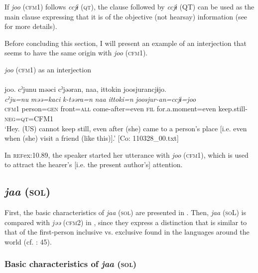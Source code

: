   If \textit{joo} (\textsc{cfm}1) follows \textit{ccjɨ} (\textsc{qt}), the clause followed by \textit{ccjɨ} (QT) can be used as the main clause expressing that it is of the objective (not hearsay) information (see  for more details).

  Before concluding this section, I will present an example of an interjection that seems to have the same origin with \textit{joo} (\textsc{cfm}1).

\ea\label{ex:10.89}   \textit{joo} (\textsc{cfm}1) as an interjection\\\\
      \glll    joo.  cˀjunu  məəci  cˀjəəran,  naa,  {\textbar}ittoki{\textbar}n  joosjurancjɨjo.\\
    \textit{}  \textit{cˀju=nu}  \textit{məə=kaci}  \textit{k-təəra=n}  \textit{naa}  \textit{ittoki=n}   \textit{joosjur-an=ccjɨ=joo}\\
    \textsc{cfm}1  person=\textsc{gen}  front=\textsc{all}  come-after=even  \textsc{fil}  for.a.moment=even  keep.still-\textsc{neg}=\textsc{qt}=CFM1\\
\glt     ‘Hey. (US) cannot keep still, even after (she) came to a person’s place [i.e. even when (she) visit a friend (like this)].’  [Co: 110328\_00.txt]
\z

In \textsc{ref}{ex:10.89}, the speaker started her utterance with \textit{joo} (\textsc{cfm}1), which is used to attract the hearer’s [i.e. the present author’s] attention.

\subsection{\textit{jaa} (\textsc{sol})}\label{sec:10.5.2}

First, the basic characteristics of \textit{jaa} (\textsc{sol}) are presented in . Then, \textit{jaa} (\textsc{so}L) is compared with \textit{jəə} (\textsc{cfm}2) in , since they express a distinction that is similar to that of the first-person inclusive vs. exclusive found in the languages around the world (cf. \citealt{Payne1997}: 45).

\subsubsection{Basic characteristics of \textit{jaa} (\textsc{sol})}\label{sec:10.5.2.1}

